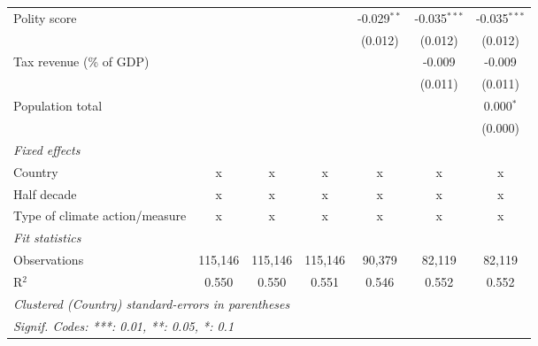 \begin{tabular}{lcccccc}
   Polity score                                                        &         &                &                & -0.029$^{**}$  & -0.035$^{***}$ & -0.035$^{***}$\\   
                                                                       &         &                &                & (0.012)        & (0.012)        & (0.012)\\   
   Tax revenue (\% of GDP)                                             &         &                &                &                & -0.009         & -0.009\\   
                                                                       &         &                &                &                & (0.011)        & (0.011)\\   
   Population total                                                    &         &                &                &                &                & 0.000$^{*}$\\   
                                                                       &         &                &                &                &                & (0.000)\\   
   \emph{Fixed effects}\\
   Country                                                             & x       & x              & x              & x              & x              & x\\  
   Half decade                                                         & x       & x              & x              & x              & x              & x\\  
   Type of climate action/measure                                      & x       & x              & x              & x              & x              & x\\  
   \midrule \emph{Fit statistics}\\
   Observations                                                        & 115,146 & 115,146        & 115,146        & 90,379         & 82,119         & 82,119\\  
   R$^2$                                                               & 0.550   & 0.550          & 0.551          & 0.546          & 0.552          & 0.552\\  
   \midrule
   \multicolumn{7}{l}{\emph{Clustered (Country) standard-errors in parentheses}}\\
   \multicolumn{7}{l}{\emph{Signif. Codes: ***: 0.01, **: 0.05, *: 0.1}}\\
\end{tabular}
\par\endgroup


